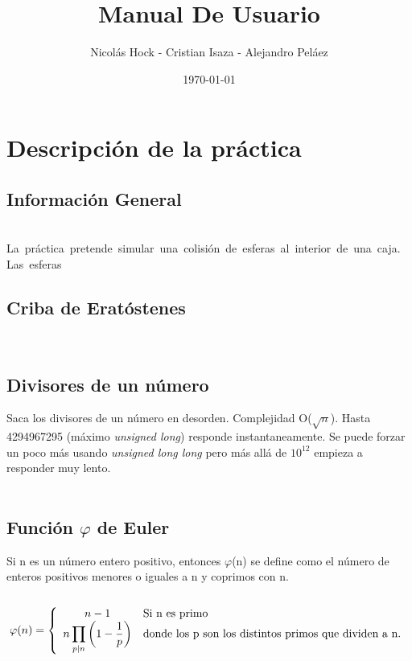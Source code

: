 \documentclass[10pt,letterpaper]{article}
\begin{document}
\title{Manual De Usuario}
\author{Nicolás Hock - Cristian Isaza - Alejandro Peláez}
\date{\today}
\maketitle
\tableofcontents
{}
\section{Descripción de la práctica}
\subsection{Información General}
\mbox{} \\
\mbox{La práctica pretende simular una colisión de esferas al interior de una caja. Las esferas} \\
\subsection{Criba de Eratóstenes}
\mbox{} \\
\subsection{Divisores de un número}
Saca los divisores de un número en desorden. Complejidad O($\sqrt{n}$).
Hasta 4294967295 (máximo \textit{unsigned long}) responde instantaneamente. Se puede
forzar un poco más usando \textit{unsigned long long} pero más allá de $10^{12}$ empieza a
responder muy lento.
\mbox{} \\
\mbox{} \\
\subsection{Función $ \varphi $ de Euler}
Si n es un número entero positivo, entonces $ \varphi $(n) se define como el número de enteros positivos menores o iguales a n y coprimos con n.
\mbox{} \\
\mbox{} \\
$$ \varphi (n) = \left\{
\begin{array}{c l}
 n-1 & \mbox{Si n es primo}\\
 \displaystyle n\prod_{p|n}\left(1-\frac{1}{p}\right) & \mbox{donde los p son los distintos primos que dividen a n.}\\
\end{array}
\right.
$$
\mbox{} \\
\mbox{} \\
\end{document}
